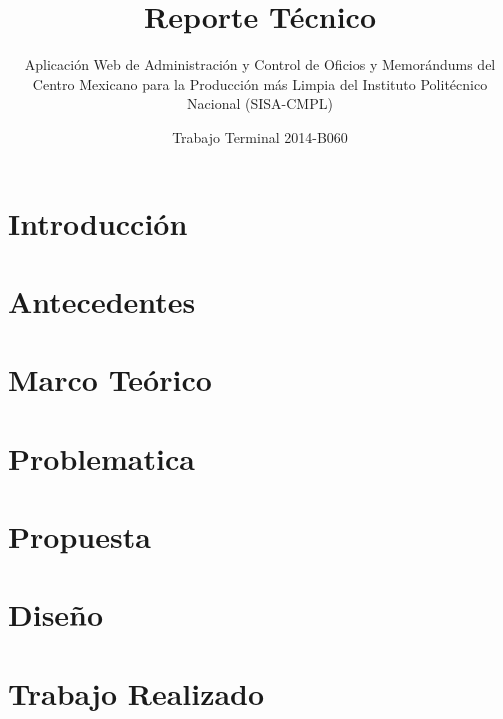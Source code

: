 \documentclass[oneside,10pt]{book}
\title{Reporte Técnico}
\subtitle{Aplicación Web de Administración y Control de Oficios y Memorándums del Centro Mexicano para la Producción más Limpia del Instituto Politécnico Nacional (SISA-CMPL)}
\author{Trabajo Terminal 2014-B060}
\begin{document}
\maketitle
\thispagestyle{empty}

\frontmatter
\tableofcontents

\mainmatter

\chapter{Introducción}


\chapter{Antecedentes}


\chapter{Marco Teórico}


\chapter{Problematica}


\chapter{Propuesta}


\chapter{Diseño}



\chapter{Trabajo Realizado}
\end{document}

